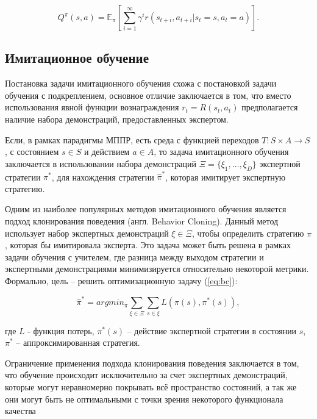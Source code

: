         \begin{equation}
            Q^{\pi} (s, a) = \mathbb{E}_{\pi} \left[ \sum_{i = 1}^{\infty} \gamma^i r(s_{t + i}, a_{t + i} | s_t = s, a_t = a) \right].
            \label{eq:Q}
        \end{equation}

        
    \subsection{Имитационное обучение}

        Постановка задачи имитационного обучения схожа с постановкой задачи обучения с подкреплением, основное отличие заключается в том, что вместо использования явной функции вознаграждения $r_t = R(s_t, a_t)$ предполагается наличие набора демонстраций, предоставленных экспертом.

        Если, в рамках парадигмы МППР, есть среда с функцией переходов $T: S \times A \to S$, с состоянием $s \in S$ и действием $a \in A$, то задача имитационного обучения заключается в использовании набора демонстраций $\Xi = \{ \xi_1, \dots, \xi_D\}$ экспертной стратегии $\pi^*$, для нахождения стратегии $\hat{\pi}^*$, которая имитирует экспертную стратегию.

        Одним из наиболее популярных методов имитационного обучения является подход клонирования поведения (англ. Behavior Cloning). Данный метод использует набор экспертных демонстраций $\xi \in \Xi$, чтобы определить стратегию $\pi$, которая бы имитировала эксперта. Это задача может быть решена в рамках задачи обучения с учителем, где разница между выходом стратегии и экспертными демонстрациями минимизируется относительно некоторой метрики. Формально, цель -- решить оптимизационную задачу (\ref{eq:bc}):

        \begin{equation}
            \hat{\pi}^* = argmin_{\pi} \sum_{\xi \in \Xi} \sum_{s \in \xi} L (\pi(s), \pi^*(s)),
            \label{eq:bc}
        \end{equation}

        где $L$ - функция потерь, $\pi^*(s)$ -- действие экспертной стратегии в состоянии $s$, $\pi^*$ -- аппроксимированная стратегия. 

        Ограничение применения подхода клонирования поведения заключается в том, что обучение происходит исключительно за счет экспертных демонстраций, которые могут неравномерно покрывать всё пространство состояний, а так же они могут быть не оптимальными с точки зрения некоторого функционала качества
        


